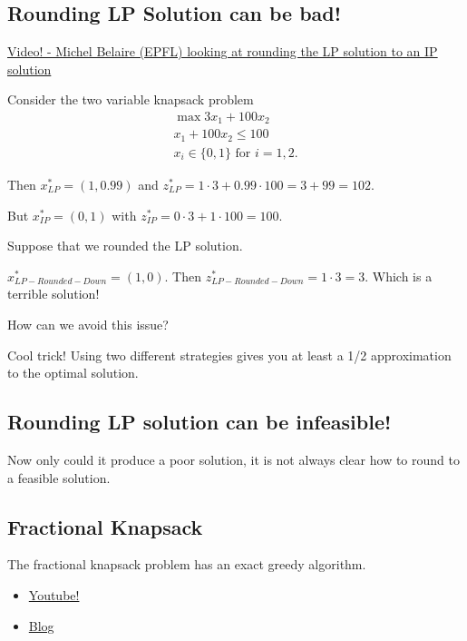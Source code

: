 \documentclass[../open-optimization/open-optimization.tex]{subfiles}
\begin{document}
  
  
  \subsection{Rounding LP Solution can be bad!}
  \href{https://youtu.be/Az7HUuq4SOI?t=189}{Video! - Michel Belaire (EPFL) looking at rounding the LP solution to an IP solution}
  
  Consider the two variable knapsack problem
  \begin{align}
  \max   3x_1 + 100 x_2\\
              x_1  + 100 x_2 \leq 100\\
              x_i \in \{0,1\} \text{ for } i=1,2.
  \end{align}
  
  Then $x^*_{LP} = (1, 0.99)$ and $z^*_{LP} = 1\cdot 3 + 0.99\cdot 100 = 3 + 99 = 102.$
  
  But $x^*_{IP} = (0,1)$ with $z^*_{IP} = 0\cdot 3 + 1 \cdot 100 = 100$.
  
  Suppose that we rounded the LP solution.  
  
  $x^*_{LP-Rounded-Down} = (1,0)$.  Then $z^*_{LP-Rounded-Down} = 1\cdot 3 = 3$.  Which is a terrible solution!
  
  
  How can we avoid this issue?
  
  
  Cool trick!   Using two different strategies gives you at least a 1/2 approximation to the optimal solution.
  
  
  \subsection{Rounding LP solution can be infeasible!}
  Now only could it produce a poor solution, it is not always clear how to round to a feasible solution.  
  
\subsection{Fractional Knapsack}
The fractional knapsack problem has an exact greedy algorithm.

\begin{itemize}
\item \href{https://www.youtube.com/watch?time_continue=424&v=m1p-eWxrt6g}{Youtube!}
\item \href{https://www.geeksforgeeks.org/fractional-knapsack-problem/}{Blog}
\end{itemize}
\end{document}
